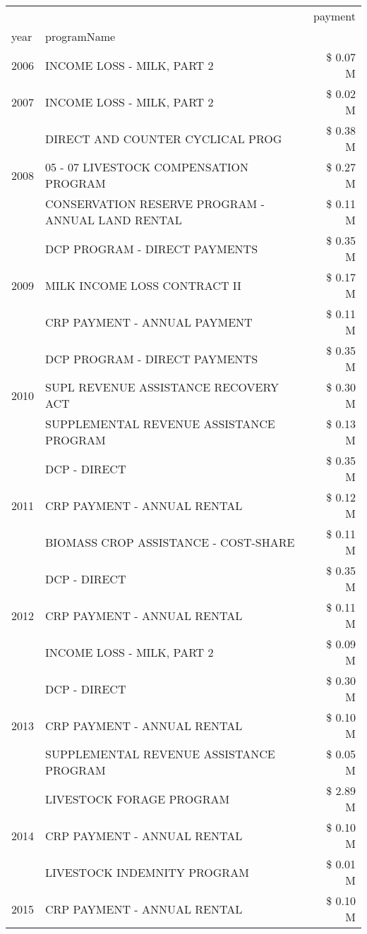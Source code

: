 \begin{tabular}{llr}
\toprule
 &  & payment \\
year & programName &  \\
\midrule
2006 & INCOME LOSS - MILK, PART 2 & \$ 0.07 M \\
\cline{1-3}
2007 & INCOME LOSS - MILK, PART 2 & \$ 0.02 M \\
\cline{1-3}
\multirow[t]{3}{*}{2008} & DIRECT AND COUNTER CYCLICAL PROG & \$ 0.38 M \\
 & 05 - 07 LIVESTOCK COMPENSATION PROGRAM & \$ 0.27 M \\
 & CONSERVATION RESERVE PROGRAM - ANNUAL LAND RENTAL & \$ 0.11 M \\
\cline{1-3}
\multirow[t]{3}{*}{2009} & DCP PROGRAM - DIRECT PAYMENTS & \$ 0.35 M \\
 & MILK INCOME LOSS CONTRACT II & \$ 0.17 M \\
 & CRP PAYMENT - ANNUAL PAYMENT & \$ 0.11 M \\
\cline{1-3}
\multirow[t]{3}{*}{2010} & DCP PROGRAM - DIRECT PAYMENTS & \$ 0.35 M \\
 & SUPL REVENUE ASSISTANCE RECOVERY ACT & \$ 0.30 M \\
 & SUPPLEMENTAL REVENUE ASSISTANCE PROGRAM & \$ 0.13 M \\
\cline{1-3}
\multirow[t]{3}{*}{2011} & DCP - DIRECT & \$ 0.35 M \\
 & CRP PAYMENT - ANNUAL RENTAL & \$ 0.12 M \\
 & BIOMASS CROP ASSISTANCE - COST-SHARE & \$ 0.11 M \\
\cline{1-3}
\multirow[t]{3}{*}{2012} & DCP - DIRECT & \$ 0.35 M \\
 & CRP PAYMENT - ANNUAL RENTAL & \$ 0.11 M \\
 & INCOME LOSS - MILK, PART 2 & \$ 0.09 M \\
\cline{1-3}
\multirow[t]{3}{*}{2013} & DCP - DIRECT & \$ 0.30 M \\
 & CRP PAYMENT - ANNUAL RENTAL & \$ 0.10 M \\
 & SUPPLEMENTAL REVENUE ASSISTANCE PROGRAM & \$ 0.05 M \\
\cline{1-3}
\multirow[t]{3}{*}{2014} & LIVESTOCK FORAGE PROGRAM & \$ 2.89 M \\
 & CRP PAYMENT - ANNUAL RENTAL & \$ 0.10 M \\
 & LIVESTOCK INDEMNITY PROGRAM & \$ 0.01 M \\
\cline{1-3}
\multirow[t]{3}{*}{2015} & CRP PAYMENT - ANNUAL RENTAL & \$ 0.10 M \\

\end{tabular}
